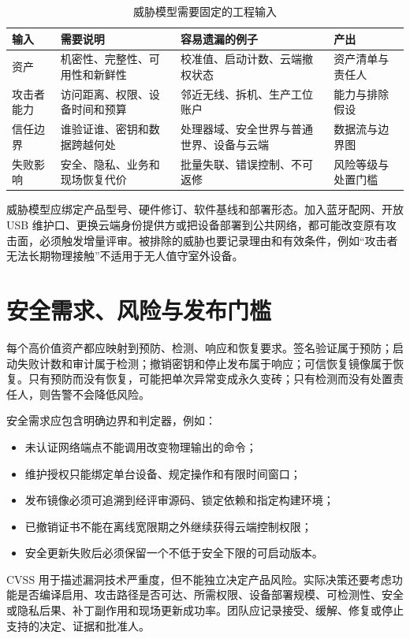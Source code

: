 \begin{table}[H]
  \centering
  \caption{威胁模型需要固定的工程输入}
  \begin{tabular}{p{27mm}p{40mm}p{42mm}p{27mm}}
    \hline
    输入 & 需要说明 & 容易遗漏的例子 & 产出 \\
    \hline
    资产 & 机密性、完整性、可用性和新鲜性 & 校准值、启动计数、云端撤权状态 & 资产清单与责任人 \\
    攻击者能力 & 访问距离、权限、设备时间和预算 & 邻近无线、拆机、生产工位账户 & 能力与排除假设 \\
    信任边界 & 谁验证谁、密钥和数据跨越何处 & 处理器域、安全世界与普通世界、设备与云端 & 数据流与边界图 \\
    失败影响 & 安全、隐私、业务和现场恢复代价 & 批量失联、错误控制、不可返修 & 风险等级与处置门槛 \\
    \hline
  \end{tabular}
\end{table}

威胁模型应绑定产品型号、硬件修订、软件基线和部署形态。加入蓝牙配网、开放 USB 维护口、更换云端身份提供方或把设备部署到公共网络，都可能改变原有攻击面，必须触发增量评审。被排除的威胁也要记录理由和有效条件，例如“攻击者无法长期物理接触”不适用于无人值守室外设备。

\section{安全需求、风险与发布门槛}

每个高价值资产都应映射到预防、检测、响应和恢复要求。签名验证属于预防；启动失败计数和审计属于检测；撤销密钥和停止发布属于响应；可信恢复镜像属于恢复。只有预防而没有恢复，可能把单次异常变成永久变砖；只有检测而没有处置责任人，则告警不会降低风险。

安全需求应包含明确边界和判定器，例如：

\begin{itemize}
  \item 未认证网络端点不能调用改变物理输出的命令；
  \item 维护授权只能绑定单台设备、规定操作和有限时间窗口；
  \item 发布镜像必须可追溯到经评审源码、锁定依赖和指定构建环境；
  \item 已撤销证书不能在离线宽限期之外继续获得云端控制权限；
  \item 安全更新失败后必须保留一个不低于安全下限的可启动版本。
\end{itemize}

CVSS 用于描述漏洞技术严重度，但不能独立决定产品风险\cite{first-cvss-v4}。实际决策还要考虑功能是否编译启用、攻击路径是否可达、所需权限、设备部署规模、可检测性、安全或隐私后果、补丁副作用和现场更新成功率。团队应记录接受、缓解、修复或停止支持的决定、证据和批准人。

